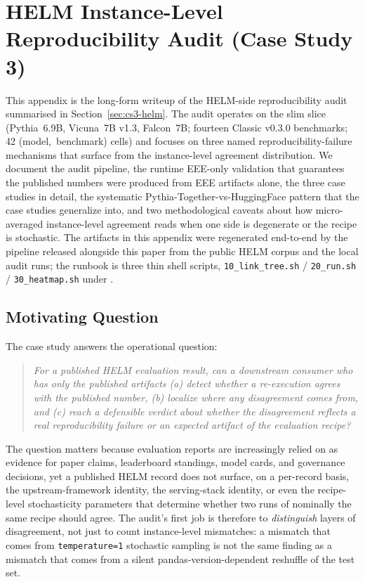 \section{HELM Instance-Level Reproducibility Audit (Case Study 3)}
\label{sec:app-helm-audit-v2}

This appendix is the long-form writeup of the HELM-side reproducibility
  audit summarised in Section~\ref{sec:cs3-helm}.
The audit operates on the slim slice
  (Pythia~6.9B, Vicuna~7B v1.3, Falcon~7B; fourteen Classic v0.3.0
  benchmarks; 42 \mbox{(model, benchmark)} cells) and focuses on three
  named reproducibility-failure mechanisms that surface from the
  instance-level agreement distribution.
We document the audit pipeline, the runtime EEE-only validation that
  guarantees the published numbers were produced from EEE artifacts
  alone, the three case studies in detail, the systematic
  Pythia-Together-vs-HuggingFace pattern that the case studies
  generalize into, and two methodological caveats about how
  micro-averaged instance-level agreement reads when one side is
  degenerate or the recipe is stochastic.
The artifacts in this appendix were regenerated end-to-end by the
  pipeline released alongside this paper from the public HELM corpus
  and the local audit runs; the runbook is three thin shell scripts,
  \texttt{10\_link\_tree.sh} / \texttt{20\_run.sh} / \texttt{30\_heatmap.sh}
  under
  .

\subsection{Motivating Question}
\label{sec:app-helm-question-v2}

The case study answers the operational question:
\begin{quote}\itshape
For a published HELM evaluation result, can a downstream consumer who
  has only the published artifacts (a) detect whether a re-execution
  agrees with the published number, (b) localize where any
  disagreement comes from, and (c) reach a defensible verdict about
  whether the disagreement reflects a real reproducibility failure or
  an expected artifact of the evaluation recipe?
\end{quote}
The question matters because evaluation reports are increasingly relied
  on as evidence for paper claims, leaderboard standings, model cards,
  and governance decisions, yet a published HELM record does not
  surface, on a per-record basis, the upstream-framework identity, the
  serving-stack identity, or even the recipe-level stochasticity
  parameters that determine whether two runs of nominally the same
  recipe should agree.
The audit's first job is therefore to \emph{distinguish} layers of
  disagreement, not just to count instance-level mismatches: a
  mismatch that comes from \texttt{temperature=1} stochastic sampling
  is not the same finding as a mismatch that comes from a silent
  pandas-version-dependent reshuffle of the test set.

